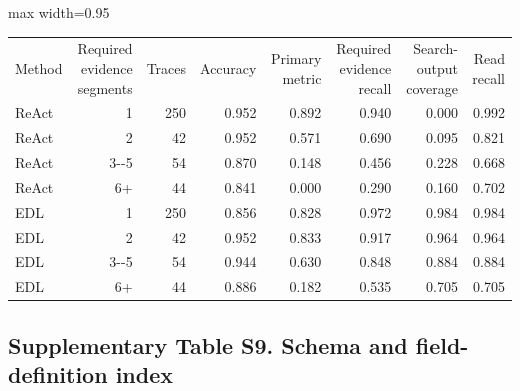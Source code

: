 \documentclass[
  8pt,
]{extarticle}
\begin{document}
\begin{center}
\begin{adjustbox}{max width=0.95\textwidth}
\begin{tabular}{@{}
lrrrrrrr@{}}
\toprule\noalign{}
Method & Required evidence segments & Traces & Accuracy & Primary metric
& Required evidence recall & Search-output coverage & Read recall \\

ReAct & 1 & 250 & 0.952 & 0.892 & 0.940 & 0.000 & 0.992 \\
ReAct & 2 & 42 & 0.952 & 0.571 & 0.690 & 0.095 & 0.821 \\
ReAct & 3-\/-5 & 54 & 0.870 & 0.148 & 0.456 & 0.228 & 0.668 \\
ReAct & 6+ & 44 & 0.841 & 0.000 & 0.290 & 0.160 & 0.702 \\
EDL & 1 & 250 & 0.856 & 0.828 & 0.972 & 0.984 & 0.984 \\
EDL & 2 & 42 & 0.952 & 0.833 & 0.917 & 0.964 & 0.964 \\
EDL & 3-\/-5 & 54 & 0.944 & 0.630 & 0.848 & 0.884 & 0.884 \\
EDL & 6+ & 44 & 0.886 & 0.182 & 0.535 & 0.705 & 0.705 \\
\bottomrule
\end{tabular}
\end{adjustbox}
\end{center}

\hypertarget{supplementary-table-s9-schema-and-field-definition-index}{%
\subsection{Supplementary Table S9. Schema and field-definition
index}\label{supplementary-table-s9-schema-and-field-definition-index}}
\end{document}
